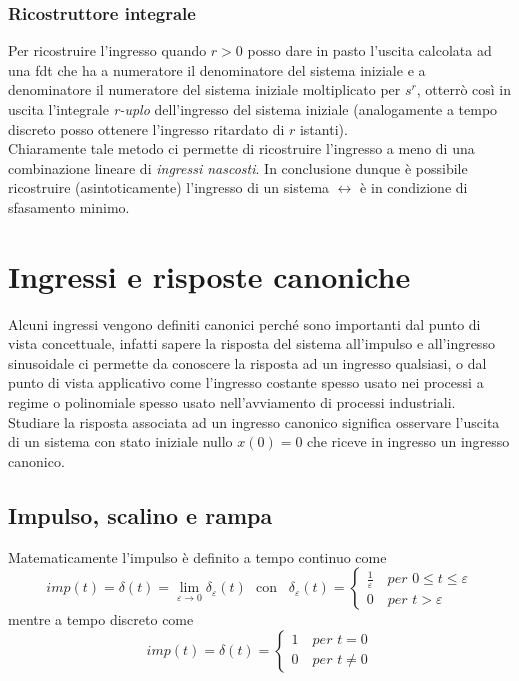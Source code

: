 \documentclass[a4paper]{article}
\begin{document}
	\subsubsection{Ricostruttore integrale}
	Per ricostruire l'ingresso quando $r>0$ posso dare in pasto l'uscita calcolata ad una fdt che ha a numeratore il denominatore del sistema iniziale e a denominatore il numeratore del sistema iniziale moltiplicato per $s^r$, otterrò così in uscita l'integrale \emph{r-uplo} dell'ingresso del sistema iniziale (analogamente a tempo discreto posso ottenere l'ingresso ritardato di $r$ istanti).
	\newline\\
	Chiaramente tale metodo ci permette di ricostruire l'ingresso a meno di una combinazione lineare di \emph{ingressi nascosti}. In conclusione dunque è possibile ricostruire (asintoticamente) l'ingresso di un sistema $\leftrightarrow$ è in condizione di sfasamento minimo.
	
	\section{Ingressi e risposte canoniche}
	Alcuni ingressi vengono definiti canonici perché sono importanti dal punto di vista concettuale, infatti sapere la risposta del sistema all'impulso e all'ingresso sinusoidale ci permette da conoscere la risposta ad un ingresso qualsiasi, o dal punto di vista applicativo come l'ingresso costante spesso usato nei processi a regime o polinomiale spesso usato nell'avviamento di processi industriali.\newline \\
	Studiare la risposta associata ad un ingresso canonico significa osservare l'uscita di un sistema con stato iniziale nullo $x(0)=0$ che riceve in ingresso un ingresso canonico.
	
	\subsection{Impulso, scalino e rampa}
	Matematicamente l'impulso è definito a tempo continuo come \[imp(t)=\delta(t)=\lim\limits_{\varepsilon \to 0}\delta_\varepsilon(t) \,\,\,\, \text{con} \,\,\,\,\, \delta_\varepsilon(t)=\begin{cases}
	\frac{1}{\varepsilon} \quad per \,\, 0\le t\le \varepsilon \\
	0 \quad per \,\, t>\varepsilon
	\end{cases}\] 
	mentre a tempo discreto come
	\[imp(t)=\delta(t)=\begin{cases}
	1 \quad per \,\, t=0 \\
	0 \quad per \,\, t\ne0
	\end{cases}
	\]
\end{document}
